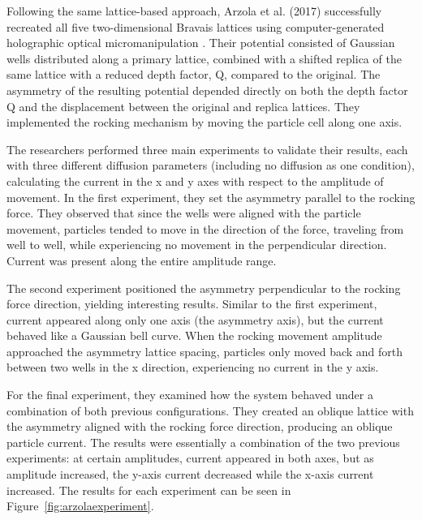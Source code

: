  Following the same lattice-based approach, Arzola et al. (2017) successfully recreated all five two-dimensional Bravais lattices using computer-generated holographic optical micromanipulation \cite{arzola2017omnidirectional}. Their potential consisted of Gaussian wells distributed along a primary lattice, combined with a shifted replica of the same lattice with a reduced depth factor, Q, compared to the original. The asymmetry of the resulting potential depended directly on both the depth factor Q and the displacement between the original and replica lattices. They implemented the rocking mechanism by moving the particle cell along one axis.

The researchers performed three main experiments to validate their results, each with three different diffusion parameters (including no diffusion as one condition), calculating the current in the x and y axes with respect to the amplitude of movement. In the first experiment, they set the asymmetry parallel to the rocking force. They observed that since the wells were aligned with the particle movement, particles tended to move in the direction of the force, traveling from well to well, while experiencing no movement in the perpendicular direction. Current was present along the entire amplitude range.

The second experiment positioned the asymmetry perpendicular to the rocking force direction, yielding interesting results. Similar to the first experiment, current appeared along only one axis (the asymmetry axis), but the current behaved like a Gaussian bell curve. When the rocking movement amplitude approached the asymmetry lattice spacing, particles only moved back and forth between two wells in the x direction, experiencing no current in the y axis.

For the final experiment, they examined how the system behaved under a combination of both previous configurations. They created an oblique lattice with the asymmetry aligned with the rocking force direction, producing an oblique particle current. The results were essentially a combination of the two previous experiments: at certain amplitudes, current appeared in both axes, but as amplitude increased, the y-axis current decreased while the x-axis current increased. The results for each experiment can be seen in Figure~\ref{fig:arzolaexperiment}.

